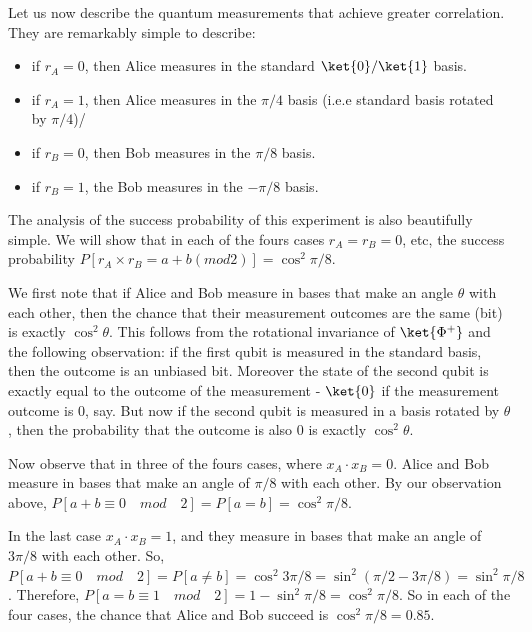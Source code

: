 \documentclass[12pt, oneside]{book}
\theoremstyle{definition}
\theoremstyle{definition}
\theoremstyle{remark}
\begin{document}
Let us now describe the quantum measurements that achieve greater correlation. They are remarkably simple to describe:
\begin{itemize}
    \item if $r_A=0$, then Alice measures in the standard $\ket{0}/\ket{1}$ basis.
    \item if $r_A=1$, then Alice measures in the $\pi/4$ basis (i.e.e standard basis rotated by $\pi/4$)/
    \item if $r_B=0$, then Bob measures in the $\pi/8$ basis.
    \item if $r_B=1$, the Bob measures in the $-\pi/8$ basis.
\end{itemize}
The analysis of the success probability of this experiment is also beautifully simple. We will show that in each of the fours cases $r_A=r_B=0$, etc, the success probability $P[r_A \times r_B=a+b(mod2)]=\cos^2 \pi/8$.

We first note that if Alice and Bob measure in bases that make an angle $\theta$ with each other, then the chance that their measurement outcomes are the same (bit) is exactly $\cos^2 \theta$. This follows from the rotational invariance of $\ket{\Phi^{+}}$ and the following observation: if the first qubit is measured in the standard basis, then the outcome is an unbiased bit. Moreover the state of the second qubit is exactly equal to the outcome of the measurement - $\ket{0}$ if the measurement outcome is 0, say. But now if the second qubit is measured in a basis rotated by $\theta$, then the probability that the outcome is also $0$ is exactly $\cos^2 \theta$.

Now observe that in three of the fours cases, where $x_A\cdot x_B=0$. Alice and Bob measure in bases that make an angle of $\pi/8$ with each other. By our observation above, $P[a+b\equiv 0 \quad mod \quad 2]=P[a=b]=\cos^2 \pi/8$.

In the last case $x_A \cdot x_B=1$, and they measure in bases that make an angle of $3\pi/8$ with each other. So, $P[a+b \equiv 0 \quad mod \quad 2]=P[a \neq b] = \cos^2 3\pi/8=\sin^2 (\pi/2-3\pi/8)=\sin^2 \pi/8$. Therefore, $P[a=b \equiv 1 \quad mod \quad 2]=1-\sin^2 \pi/8=\cos^2 \pi/8$. So in each of the four cases, the chance that Alice and Bob succeed is $\cos^2 \pi/8=0.85$.
\end{document}
